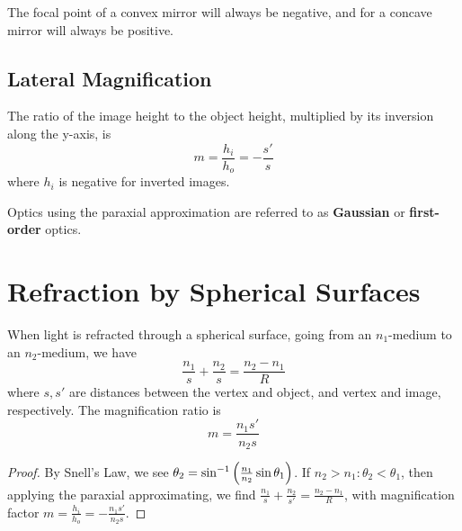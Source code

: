 \begin{note}
    The focal point of a convex mirror will always be negative, and for a concave mirror will always be positive.
\end{note}

\subsection{Lateral Magnification}

\begin{definition}
    The ratio of the image height to the object height, multiplied by its inversion along the y-axis, is $$m = \frac{h_i}{h_o} = -\frac{s'}{s}$$ where $h_i$ is negative for inverted images.
\end{definition}

\begin{remark}
    Optics using the paraxial approximation are referred to as \textbf{Gaussian} or \textbf{first-order} optics.
\end{remark}

\section{Refraction by Spherical Surfaces}


\begin{theorem}
    When light is refracted through a spherical surface, going from an $n_1$-medium to an $n_2$-medium, we have $$\frac{n_1}{s} + \frac{n_2}{s} = \frac{n_2 - n_1}{R}$$ where $s, s'$ are distances between the vertex and object, and vertex and image, respectively. The magnification ratio is $$m = \frac{n_1s'}{n_2s}$$
\end{theorem}
\begin{proof}
    By Snell's Law, we see $\theta_2 = \sin^{-1}\left(\frac{n_1}{n_2}\sin\theta_1\right)$.
    If $n_2 > n_1: \theta_2 < \theta_1$, then applying the paraxial approximating, we find $\frac{n_1}{s} + \frac{n_2}{s'} = \frac{n_2 - n_1}{R}$, with magnification factor $m = \frac{h_i}{h_o} = -\frac{n_1s'}{n_2s}$.
\end{proof}